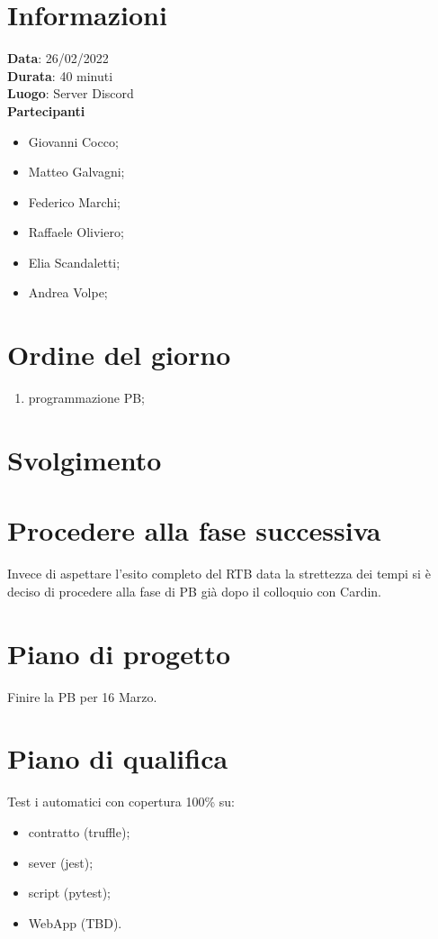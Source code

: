 \documentclass[a4paper, 12pt]{article}
\begin{document}
\makefrontpage

\section{Informazioni}
\textbf{Data}: 26/02/2022\\
\textbf{Durata}: 40 minuti\\
\textbf{Luogo}: Server Discord\\

\textbf{Partecipanti}
\begin{itemize}
	\item Giovanni Cocco;
	\item Matteo Galvagni;
	\item Federico Marchi;
	\item Raffaele Oliviero;
	\item Elia Scandaletti;
	\item Andrea Volpe;
\end{itemize}

\section{Ordine del giorno}
\begin{enumerate}
	\item programmazione PB;

\end{enumerate}

\section{Svolgimento}
\section{Procedere alla fase successiva}
Invece di aspettare l'esito completo del RTB data la strettezza dei tempi si è deciso di procedere alla fase di PB già dopo il colloquio con Cardin.

\section{Piano di progetto}
Finire la PB per 16 Marzo.

\section{Piano di qualifica}
Test i automatici con copertura 100\% su:
\begin{itemize}
	\item contratto (truffle);
	\item sever (jest);
	\item script (pytest);
	\item WebApp (TBD).
\end{itemize}
\end{document}
